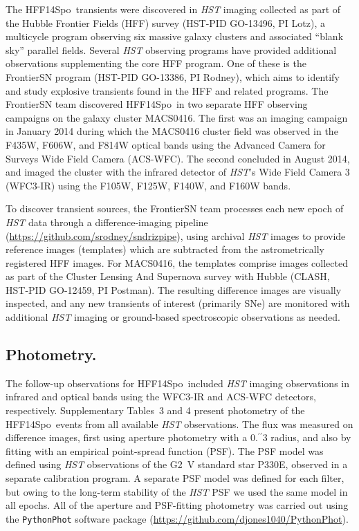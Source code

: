 \documentclass{article}
\providecommand\citep{\cite}
\providecommand\citet{\cite}
\def\farcs{\mbox{\ensuremath{.\!\!^{\prime\prime}}}}
\def\HST{{\it HST}\xspace}
\def\spock{HFF14Spo\xspace}
\def\MACS0416{MACS0416\xspace}
\begin{document}
The \spock\ transients were discovered in \HST imaging collected as part
of the Hubble Frontier Fields (HFF) survey (HST-PID GO-13496, PI Lotz),
a multicycle program observing six massive galaxy clusters and
associated ``blank sky'' parallel fields\cite{Lotz:2017}.  Several
\HST observing programs have provided additional observations
supplementing the core HFF program.  One of these is the FrontierSN
program (HST-PID GO-13386, PI Rodney), which aims to identify and study
explosive transients found in the HFF and related
programs\citet{Rodney:2015a}.  The FrontierSN team discovered
\spock\ in two separate HFF observing campaigns on the galaxy cluster
\MACS0416.  The first was an imaging campaign in January 2014 during
which the MACS0416 cluster field was observed in the F435W, F606W, and
F814W optical bands using the Advanced Camera for Surveys Wide Field
Camera (ACS-WFC).  The second concluded in August 2014, and imaged
the cluster with the infrared detector of \HST's Wide Field Camera 3
(WFC3-IR) using the F105W, F125W, F140W, and F160W bands.

To discover transient sources, the FrontierSN team processes each new
epoch of \HST data through a difference-imaging
pipeline (\url{https://github.com/srodney/sndrizpipe}), using
archival \HST images to provide reference images (templates) which are
subtracted from the astrometrically registered HFF images. For \MACS0416, the templates comprise images collected as
part of the Cluster Lensing And Supernova survey with Hubble (CLASH,
HST-PID GO-12459, PI Postman)\cite{Postman:2012}. The resulting 
difference images are
visually inspected, and any new transients of
interest (primarily SNe) are monitored with additional
\HST imaging or ground-based spectroscopic observations as needed.


\subsection{Photometry.}\label{sec:Photometry}

The follow-up observations for \spock\ included \HST imaging
observations in infrared and optical bands using the WFC3-IR and
ACS-WFC detectors, respectively. Supplementary Tables~3 and
4 present photometry of the \spock\ events from
all available \HST observations. The flux was measured on difference
images, first using aperture photometry with a 0\farcs3 radius, and
also by fitting with an empirical point-spread function (PSF).  The
PSF model was defined using \HST observations of the G2~V standard star
P330E, observed in a separate calibration program.  A separate PSF
model was defined for each filter, but owing to the long-term
stability of the \HST PSF we used the same model in all epochs.  All
of the aperture and PSF-fitting photometry was carried out using the
{\tt PythonPhot} software package
(\url{https://github.com/djones1040/PythonPhot})\citep{Jones:2015}.
\end{document}
